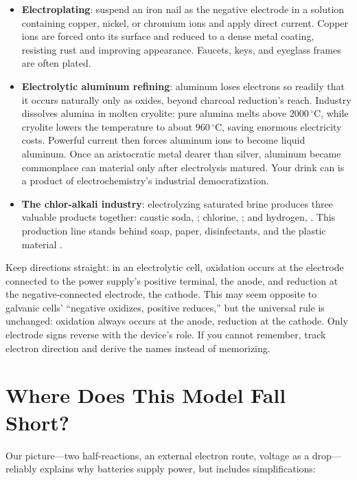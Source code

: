\begin{itemize}[itemsep=2pt]
\item \textbf{Electroplating}: suspend an iron nail as the negative electrode in a solution containing copper, nickel, or chromium ions and apply direct current. Copper ions are forced onto its surface and reduced to a dense metal coating, resisting rust and improving appearance. Faucets, keys, and eyeglass frames are often plated.
\item \textbf{Electrolytic aluminum refining}: aluminum loses electrons so readily that it occurs naturally only as oxides, beyond charcoal reduction's reach. Industry dissolves alumina in molten cryolite: pure alumina melts above $2000\,^{\circ}\mathrm{C}$, while cryolite lowers the temperature to about $960\,^{\circ}\mathrm{C}$, saving enormous electricity costs. Powerful current then forces aluminum ions to become liquid aluminum. Once an aristocratic metal dearer than silver, aluminum became commonplace can material only after electrolysis matured. Your drink can is a product of electrochemistry's industrial democratization.
\item \textbf{The chlor-alkali industry}: electrolyzing saturated brine produces three valuable products together: caustic soda, ; chlorine, ; and hydrogen, . This production line stands behind soap, paper, disinfectants, and the plastic material .
\end{itemize}

Keep directions straight: in an electrolytic cell, oxidation occurs at the electrode connected to the power supply's positive terminal, the anode, and reduction at the negative-connected electrode, the cathode. This may seem opposite to galvanic cells' ``negative oxidizes, positive reduces,'' but the universal rule is unchanged: oxidation always occurs at the anode, reduction at the cathode. Only electrode signs reverse with the device's role. If you cannot remember, track electron direction and derive the names instead of memorizing.

\section{Where Does This Model Fall Short?}

Our picture---two half-reactions, an external electron route, voltage as a drop---reliably explains why batteries supply power, but includes simplifications:

